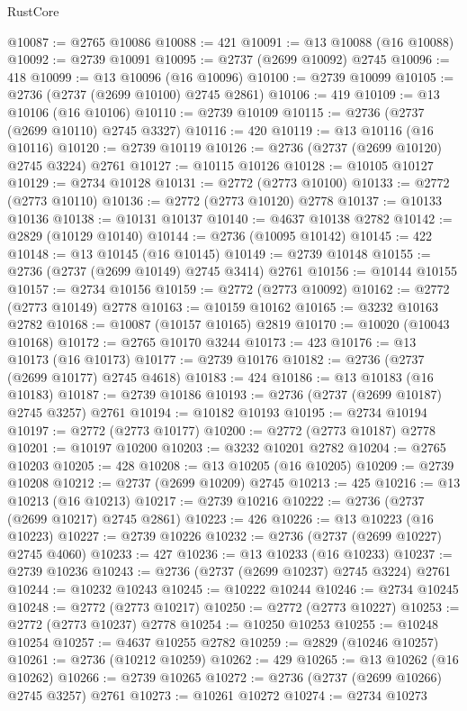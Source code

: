 \begin{lexlean}{RustCore}
\begin{coremodule}
@10087 := @2765 @10086
@10088 := 421
@10091 := @13 @10088 (@16 @10088)
@10092 := @2739 @10091
@10095 := @2737 (@2699 @10092) @2745
@10096 := 418
@10099 := @13 @10096 (@16 @10096)
@10100 := @2739 @10099
@10105 := @2736 (@2737 (@2699 @10100) @2745 @2861)
@10106 := 419
@10109 := @13 @10106 (@16 @10106)
@10110 := @2739 @10109
@10115 := @2736 (@2737 (@2699 @10110) @2745 @3327)
@10116 := 420
@10119 := @13 @10116 (@16 @10116)
@10120 := @2739 @10119
@10126 := @2736 (@2737 (@2699 @10120) @2745 @3224) @2761
@10127 := @10115 @10126
@10128 := @10105 @10127
@10129 := @2734 @10128
@10131 := @2772 (@2773 @10100)
@10133 := @2772 (@2773 @10110)
@10136 := @2772 (@2773 @10120) @2778
@10137 := @10133 @10136
@10138 := @10131 @10137
@10140 := @4637 @10138 @2782
@10142 := @2829 (@10129 @10140)
@10144 := @2736 (@10095 @10142)
@10145 := 422
@10148 := @13 @10145 (@16 @10145)
@10149 := @2739 @10148
@10155 := @2736 (@2737 (@2699 @10149) @2745 @3414) @2761
@10156 := @10144 @10155
@10157 := @2734 @10156
@10159 := @2772 (@2773 @10092)
@10162 := @2772 (@2773 @10149) @2778
@10163 := @10159 @10162
@10165 := @3232 @10163 @2782
@10168 := @10087 (@10157 @10165) @2819
@10170 := @10020 (@10043 @10168)
@10172 := @2765 @10170 @3244
@10173 := 423
@10176 := @13 @10173 (@16 @10173)
@10177 := @2739 @10176
@10182 := @2736 (@2737 (@2699 @10177) @2745 @4618)
@10183 := 424
@10186 := @13 @10183 (@16 @10183)
@10187 := @2739 @10186
@10193 := @2736 (@2737 (@2699 @10187) @2745 @3257) @2761
@10194 := @10182 @10193
@10195 := @2734 @10194
@10197 := @2772 (@2773 @10177)
@10200 := @2772 (@2773 @10187) @2778
@10201 := @10197 @10200
@10203 := @3232 @10201 @2782
@10204 := @2765 @10203
@10205 := 428
@10208 := @13 @10205 (@16 @10205)
@10209 := @2739 @10208
@10212 := @2737 (@2699 @10209) @2745
@10213 := 425
@10216 := @13 @10213 (@16 @10213)
@10217 := @2739 @10216
@10222 := @2736 (@2737 (@2699 @10217) @2745 @2861)
@10223 := 426
@10226 := @13 @10223 (@16 @10223)
@10227 := @2739 @10226
@10232 := @2736 (@2737 (@2699 @10227) @2745 @4060)
@10233 := 427
@10236 := @13 @10233 (@16 @10233)
@10237 := @2739 @10236
@10243 := @2736 (@2737 (@2699 @10237) @2745 @3224) @2761
@10244 := @10232 @10243
@10245 := @10222 @10244
@10246 := @2734 @10245
@10248 := @2772 (@2773 @10217)
@10250 := @2772 (@2773 @10227)
@10253 := @2772 (@2773 @10237) @2778
@10254 := @10250 @10253
@10255 := @10248 @10254
@10257 := @4637 @10255 @2782
@10259 := @2829 (@10246 @10257)
@10261 := @2736 (@10212 @10259)
@10262 := 429
@10265 := @13 @10262 (@16 @10262)
@10266 := @2739 @10265
@10272 := @2736 (@2737 (@2699 @10266) @2745 @3257) @2761
@10273 := @10261 @10272
@10274 := @2734 @10273

\end{coremodule}
\end{lexlean}
